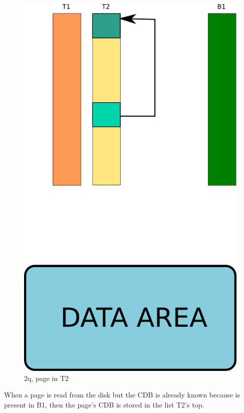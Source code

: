 \begin{figure}[H]
\includegraphics[scale=0.4]{images/2q_03.png}

\caption{2q, page in T2}

\end{figure}

When a page is read from the disk but the CDB is already known because is present in B1, then the page's CDB is stored in the list T2's 
top.\newline

